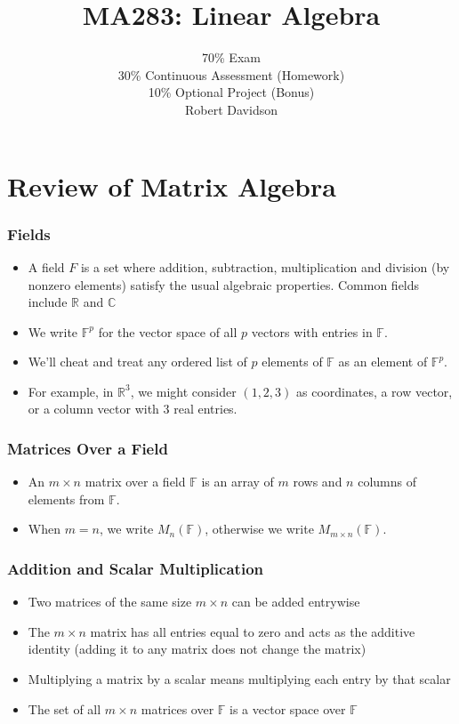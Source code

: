 \documentclass[a4paper, 9pt]{extarticle}
\title{
\textbf{MA283: Linear Algebra} \\ 
}
\author{
  70\% Exam\\
30\% Continuous Assessment (Homework) \\
10\% Optional Project (Bonus)\\ [2ex]
Robert Davidson
}
\date{}       %
\begin{document}
\maketitle
\pagebreak

\tableofcontents
\pagebreak
\section{Review of Matrix Algebra}
\subsubsection*{Fields}
\begin{itemize}
  \item A field $F$ is a set where addition, subtraction, multiplication and division (by nonzero elements)  satisfy the usual algebraic properties. Common fields include $\mathbb{R}$ and $\mathbb{C}$
  \item We write $\mathbb{F}^p$ for the vector space of all $p$ vectors with entries in $\mathbb{F}$.
  \item We'll cheat and treat any ordered list of $p$ elements of $\mathbb{F}$ as an element of $\mathbb{F}^p$.
  \item For example, in $\mathbb{R}^3$, we might consider $(1,2,3)$ as coordinates, a row vector, or a column vector with 3 real entries.
\end{itemize}


\subsubsection*{Matrices Over a Field}
\begin{itemize}
  \item An $m \times n$ matrix over a field $\mathbb{F}$ is an array of $m$ rows and $n$ columns of elements from $\mathbb{F}$.
  \item When $m = n$, we write $M_n(\mathbb{F})$, otherwise we write $M_{m \times n}(\mathbb{F})$.
\end{itemize}
\subsubsection*{Addition and Scalar Multiplication}
\begin{itemize}
  \item Two matrices of the same size $m \times n$ can be added entrywise
  \item The $m \times n$ matrix has all entries equal to zero and acts as the additive identity (adding it to any matrix does not change the matrix)
  \item Multiplying a matrix by a scalar means multiplying each entry by that scalar
  \item The set of all $m \times n$ matrices over $\mathbb{F}$ is a vector space over $\mathbb{F}$
\end{itemize}
\end{document}
